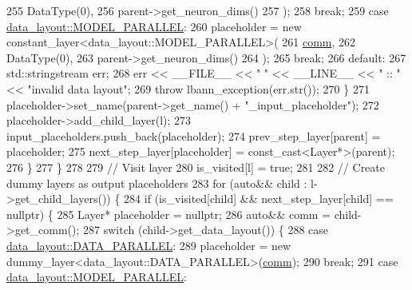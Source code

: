 \begin{DoxyCode}
255                               DataType(0),
256                               parent->get\_neuron\_dims()
257                             );
258           \textcolor{keywordflow}{break};
259         \textcolor{keywordflow}{case} \hyperlink{base_8hpp_a786677cbfb3f5677b4d84f3056eb08dbac94d7b0e44ab8bdcdad694a673cdeae0}{data\_layout::MODEL\_PARALLEL}:
260           placeholder = \textcolor{keyword}{new} constant\_layer<data\_layout::MODEL\_PARALLEL>(
261                               \hyperlink{file__io_8cpp_ab048c6f9fcbcfaa57ce68b00263dbebe}{comm},
262                               DataType(0),
263                               parent->get\_neuron\_dims()
264                             );
265           \textcolor{keywordflow}{break};
266         \textcolor{keywordflow}{default}:
267           std::stringstream err;
268           err << \_\_FILE\_\_ << \textcolor{stringliteral}{" "} << \_\_LINE\_\_ << \textcolor{stringliteral}{" :: "} << \textcolor{stringliteral}{"invalid data layout"};
269           \textcolor{keywordflow}{throw} lbann\_exception(err.str());
270         \}
271         placeholder->set\_name(parent->get\_name() + \textcolor{stringliteral}{"\_input\_placeholder"});
272         placeholder->add\_child\_layer(l);
273         input\_placeholders.push\_back(placeholder);
274         prev\_step\_layer[parent] = placeholder;
275         next\_step\_layer[placeholder] = \textcolor{keyword}{const\_cast<}Layer*\textcolor{keyword}{>}(parent);
276       \}
277     \}
278 
279     \textcolor{comment}{// Visit layer}
280     is\_visited[l] = \textcolor{keyword}{true};
281     
282     \textcolor{comment}{// Create dummy layers as output placeholders}
283     \textcolor{keywordflow}{for} (\textcolor{keyword}{auto}&& child : l->get\_child\_layers()) \{
284       \textcolor{keywordflow}{if} (is\_visited[child] && next\_step\_layer[child] == \textcolor{keyword}{nullptr}) \{
285         Layer* placeholder = \textcolor{keyword}{nullptr};
286         \textcolor{keyword}{auto}&& comm = child->get\_comm();
287         \textcolor{keywordflow}{switch} (child->get\_data\_layout()) \{
288         \textcolor{keywordflow}{case} \hyperlink{base_8hpp_a786677cbfb3f5677b4d84f3056eb08dba37d2a3465f7cbf4ab60f4e79944d0638}{data\_layout::DATA\_PARALLEL}:
289           placeholder = \textcolor{keyword}{new} dummy\_layer<data\_layout::DATA\_PARALLEL>(\hyperlink{file__io_8cpp_ab048c6f9fcbcfaa57ce68b00263dbebe}{comm});
290           \textcolor{keywordflow}{break};
291         \textcolor{keywordflow}{case} \hyperlink{base_8hpp_a786677cbfb3f5677b4d84f3056eb08dbac94d7b0e44ab8bdcdad694a673cdeae0}{data\_layout::MODEL\_PARALLEL}:

\end{DoxyCode}
